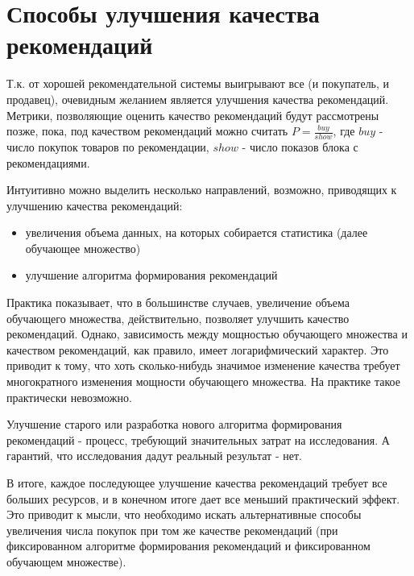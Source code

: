 \documentclass[12pt,a4paper]{report}
\begin{document}
\section{Способы улучшения качества рекомендаций}
Т.к. от хорошей рекомендательной системы выигрывают все (и покупатель, и продавец), очевидным желанием является улучшения качества рекомендаций.
Метрики, позволяющие оценить качество рекомендаций будут рассмотрены позже, пока, под качеством рекомендаций можно считать $P=\frac{buy}{show}$, где $buy$ - число покупок товаров по рекомендации, $show$ - число показов блока с рекомендациями.

Интуитивно можно выделить несколько направлений, возможно, приводящих к улучшению качества рекомендаций:
\begin{itemize}
\item увеличения объема данных, на которых собирается статистика (далее обучающее множество)
\item улучшение алгоритма формирования рекомендаций
\end{itemize}
Практика показывает, что в большинстве случаев, увеличение объема обучающего множества, действительно, позволяет улучшить качество рекомендаций. Однако, зависимость между мощностью обучающего множества и качеством рекомендаций, как правило, имеет логарифмический характер. Это приводит к тому, что хоть сколько-нибудь значимое изменение качества требует многократного изменения мощности обучающего множества. На практике такое практически невозможно.


Улучшение старого или разработка нового алгоритма формирования рекомендаций - процесс, требующий значительных затрат на исследования. А гарантий, что исследования дадут реальный результат - нет.

В итоге, каждое последующее улучшение качества рекомендаций требует все больших ресурсов, и в конечном итоге дает все меньший практический эффект.
Это приводит к мысли, что  необходимо искать альтернативные способы увеличения числа покупок при том же качестве рекомендаций (при фиксированном алгоритме формирования рекомендаций и фиксированном обучающем множестве).
\end{document}
